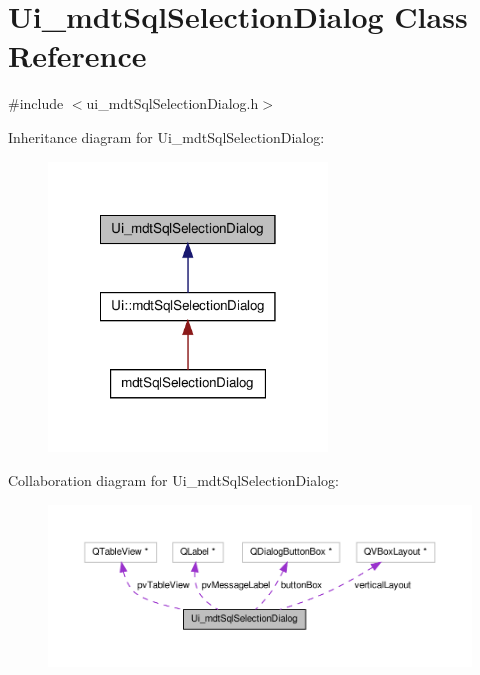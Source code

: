\hypertarget{class_ui__mdt_sql_selection_dialog}{\section{Ui\-\_\-mdt\-Sql\-Selection\-Dialog Class Reference}
\label{class_ui__mdt_sql_selection_dialog}
}


{\ttfamily \#include $<$ui\-\_\-mdt\-Sql\-Selection\-Dialog.\-h$>$}



Inheritance diagram for Ui\-\_\-mdt\-Sql\-Selection\-Dialog\-:
\nopagebreak
\begin{figure}[H]
\begin{center}
\leavevmode
\includegraphics[width=210pt]{class_ui__mdt_sql_selection_dialog__inherit__graph}
\end{center}
\end{figure}


Collaboration diagram for Ui\-\_\-mdt\-Sql\-Selection\-Dialog\-:
\nopagebreak
\begin{figure}[H]
\begin{center}
\leavevmode
\includegraphics[width=350pt]{class_ui__mdt_sql_selection_dialog__coll__graph}
\end{center}
\end{figure}

